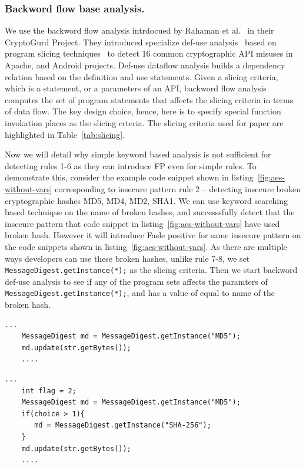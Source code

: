 \subsubsection{Backword flow base analysis.}
We use the backword flow analysis intrdocued by Rahaman et al.~\cite{cryptogurd} in their CryptoGurd Project. They introduced specialize def-use analysis~\cite{use-def} based on program slicing techniques~\cite{program-slicing} to detect 16 common cryptographic API misuses in Apache, and Android projects. Def-use  dataflow analysis builds a dependency relation based on the definition and use statements. Given a slicing criteria, which is a statement, or a parameters of an API, backword flow analysis computes the set of program statements that affects the slicing criteria in terms of data flow. The key design choice, hence, here is to specify special function invokation places as the slicing crteria. The slicing criteria used for paper are highlighted in Table~\ref{tab:slicing}. 

Now we will detail why simple keyword based analysis is not sufficient for detecting rules 1-6 as they can introduce FP even for simple rules. 
To demonstrate this, consider the example code snippet shown in listing~\ref{fig:aes-without-vars} corresponding to insecure pattern rule 2 -- 
detecting insecure broken cryptographic hashes MD5, MD4, MD2, SHA1. We can use keyword searching based technique on the name of broken hashes, 
and successsfully detect that the insecure pattern that code snippet in listing~\ref{fig:aes-without-vars} have used broken hash. However it will 
introduce Fasle positive for same insecure pattern on the code snippets shown in listing~\ref{fig:aes-without-vars}.%
As there are multiple ways developers can use these broken hashes, unlike rule 7-8, we set \texttt{MessageDigest.getInstance(*);} as the slicing criteria. 
Then we start backword def-use analysis to see if any of the program sets affects the paramters of \texttt{MessageDigest.getInstance(*);}, 
and has a value of equal to name of the broken hash.


\begin{lstlisting}[caption={A code snippet where keyword based detection work well}, label={fig:aes-without-vars}]
    ...
    MessageDigest md = MessageDigest.getInstance("MD5");
    md.update(str.getBytes());
    ....
\end{lstlisting}

\begin{lstlisting}[caption={A code snippet where keyword based detection introduces FP}, label={fig:aes-with-vars}]
    ...
    int flag = 2;
    MessageDigest md = MessageDigest.getInstance("MD5");
    if(choice > 1){
       md = MessageDigest.getInstance("SHA-256");
    }
    md.update(str.getBytes());
    ....
\end{lstlisting}

